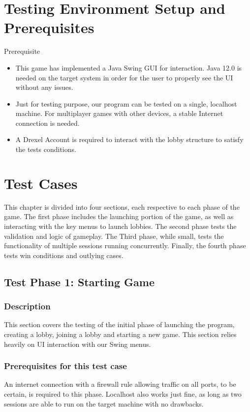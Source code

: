 \documentclass{scrreprt}
\begin{document}
\chapter{Testing Environment Setup and Prerequisites}

Prerequisite
\begin{itemize}
  \item This game has implemented a Java Swing GUI for interaction. Java 12.0 is needed on the target system in order for the user to properly see the UI without any issues.
  \item Just for testing purpose, our program can be tested on a single, localhost machine. For multiplayer games with other devices, a stable Internet connection is needed.
  \item A Drexel Account is required to interact with the lobby structure to satisfy the tests conditions.
\end{itemize}

\chapter{Test Cases}

This chapter is divided into four sections, each respective to each phase of the game. The first phase includes the launching portion of the game, as well as interacting with the key menus to launch lobbies. The second phase tests the validation and logic of gameplay. The Third phase, while small, tests the functionality of multiple sessions running concurrently. Finally, the fourth phase tests win conditions and outlying cases.

\section{Test Phase 1: Starting Game}

\subsection{Description}
This section covers the testing of the initial phase of launching the program, creating a lobby, joining a lobby and starting a new game. This section relies heavily on UI interaction with our Swing menus.

\subsection{Prerequisites for this test case}
An internet connection with a firewall rule allowing traffic on all ports, to be certain, is required to this phase. Localhost also works just fine, as long as two sessions are able to run on the target machine with no drawbacks. 
\end{document}
